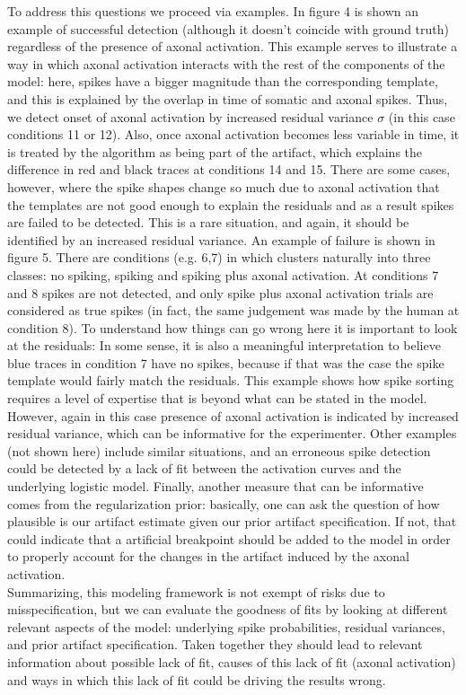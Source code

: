 \documentclass[12pt,letterpaper,fleqn]{article}
\begin{document}
To address this questions we proceed via examples. In figure 4 is shown an example of successful detection (although it doesn't coincide with ground truth) regardless of the presence of axonal activation. This example serves to illustrate a way in which axonal activation interacts with the rest of the components of the model: here, spikes have a bigger magnitude than the corresponding template, and this is explained by the overlap in time of somatic and axonal spikes. Thus, we detect onset of axonal activation by increased residual variance $\sigma$ (in this case conditions 11 or 12). Also, once axonal activation becomes less variable in time, it is treated by the algorithm as being part of the artifact, which explains the difference in red and black traces at conditions 14 and 15. There are some cases, however, where the spike shapes change so much due to axonal activation that the templates are not good enough to explain the residuals and as a result spikes are failed to be detected. This is a rare situation, and again, it should be identified by an increased residual variance. An example of failure is shown in figure 5. There are conditions (e.g. 6,7) in which clusters naturally into three classes: no spiking, spiking and spiking plus axonal activation. At conditions 7 and 8 spikes are not detected, and only spike plus axonal activation trials are considered as true spikes (in fact, the same judgement was made by the human at condition 8). To understand how things can go wrong here it is important to look at the residuals: In some sense, it is also a meaningful interpretation to believe blue traces in condition 7 have no spikes, because if that was the case the spike template would fairly match the residuals. This example shows how spike sorting requires a level of expertise that is beyond what can be stated in the model. However, again in this case presence of axonal activation is indicated by increased residual variance, which can be informative for the experimenter. Other examples (not shown here) include similar situations, and an erroneous spike detection could be detected by a lack of fit between the activation curves and the underlying logistic model. Finally, another measure that can be informative comes from the regularization prior: basically, one can ask the question of how plausible is our artifact estimate given our prior artifact specification. If not, that could indicate that a artificial breakpoint should be added to the model in order to properly account for the changes in the artifact induced by the axonal activation. 
\\Summarizing, this modeling framework is not exempt of risks due to misspecification, but we can evaluate the goodness of fits by looking at different relevant aspects of the model: underlying spike probabilities, residual variances, and prior artifact specification. Taken together they should lead to relevant information about possible lack of fit, causes of this lack of fit (axonal activation) and ways in which this lack of fit could be driving the results wrong.
\end{document}
